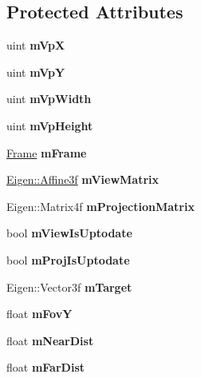 \subsection*{Protected Attributes}
\begin{DoxyCompactItemize}
\item 
\mbox{\label{class_camera_a484daa3326214555f18bda89eb7a629d}} 
uint {\bfseries m\+VpX}
\item 
\mbox{\label{class_camera_a706a8307649c1bfe922443316179d2f7}} 
uint {\bfseries m\+VpY}
\item 
\mbox{\label{class_camera_afaa5b3b9d0b31353c0d023bf930d687e}} 
uint {\bfseries m\+Vp\+Width}
\item 
\mbox{\label{class_camera_a1e598b956b82f1f059b26f4db0b8bd6c}} 
uint {\bfseries m\+Vp\+Height}
\item 
\mbox{\label{class_camera_a205261114044cc12db9f04563f2a8850}} 
\hyperlink{class_frame}{Frame} {\bfseries m\+Frame}
\item 
\mbox{\label{class_camera_a58ca2c3ba8c0585eaf75ea804126d00c}} 
\hyperlink{group___geometry___module_ga17e901de8ff882aea7845c5457db6a4f}{Eigen\+::\+Affine3f} {\bfseries m\+View\+Matrix}
\item 
\mbox{\label{class_camera_a85763ede30dd3c0ae05aec109b4ce7af}} 
Eigen\+::\+Matrix4f {\bfseries m\+Projection\+Matrix}
\item 
\mbox{\label{class_camera_aed95458f7442c3ad4ee11eb912bf5378}} 
bool {\bfseries m\+View\+Is\+Uptodate}
\item 
\mbox{\label{class_camera_a7397176fc61e29223f5fcd688f679516}} 
bool {\bfseries m\+Proj\+Is\+Uptodate}
\item 
\mbox{\label{class_camera_a5e75322c0a0b3e807e7bda8b058130ec}} 
Eigen\+::\+Vector3f {\bfseries m\+Target}
\item 
\mbox{\label{class_camera_a8847b237a8e8da1c61f648c545bc0605}} 
float {\bfseries m\+FovY}
\item 
\mbox{\label{class_camera_a7488ed04b1996910ac1c3d744d55adb0}} 
float {\bfseries m\+Near\+Dist}
\item 
\mbox{\label{class_camera_a99e2e35b409fb544fdbb678ade3812b7}} 
float {\bfseries m\+Far\+Dist}
\end{DoxyCompactItemize}


